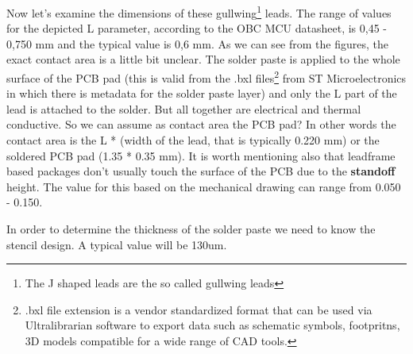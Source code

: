 \documentclass[final]{cubedoc}
\begin{document}
	
	
	
	
	
	Now let's examine the dimensions of these gullwing\footnote{The J shaped leads are the so called gullwing leads} leads. The range of values for the depicted L parameter, according to the OBC MCU datasheet, is 0,45 - 0,750 mm and the typical value is 0,6 mm. As we can see from the figures, the exact contact area is a little bit unclear. The solder paste is applied to the whole surface of the PCB pad (this is valid from the .bxl files\footnote{.bxl file extension is a vendor standardized format that can be used via Ultralibrarian software to export data such as schematic symbols, footpritns, 3D models compatible for a wide range of CAD tools.} from ST Microelectronics in which there is metadata for the solder paste layer) and only the L part of the lead is attached to the solder. But all together are electrical and thermal conductive. So we can assume as contact area the PCB pad? In other words the contact area is the L * (width of the lead, that is typically 0.220 mm) or the soldered PCB pad (1.35 * 0.35 mm). It is worth mentioning also that leadframe based packages don't usually touch the surface of the PCB due to the \textbf{standoff} height. The value for this based on the mechanical drawing can range from 0.050 - 0.150.
	
	In order to determine the thickness of the solder paste we need to know the stencil design. A typical value will be 130um.
	
	
\end{document}
